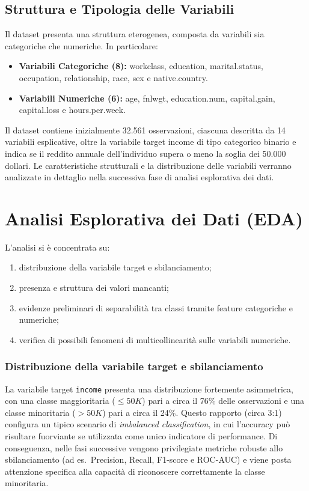 \documentclass[a4paper,11pt]{article}
\begin{document}
\subsection{Struttura e Tipologia delle Variabili}
Il dataset presenta una struttura eterogenea, composta da variabili sia categoriche che numeriche. In particolare:
\begin{itemize}
    \item \textbf{Variabili Categoriche (8):} {workclass}, {education}, {marital.status}, {occupation}, {relationship}, {race}, {sex} e {native.country}.
    \item \textbf{Variabili Numeriche (6):} {age}, {fnlwgt}, {education.num}, {capital.gain}, {capital.loss} e {hours.per.week}.
\end{itemize}

\noindent Il dataset contiene inizialmente 32.561 osservazioni, ciascuna descritta da 14 variabili esplicative, oltre la variabile target {income} di tipo categorico binario e indica se il reddito annuale dell’individuo supera o meno la soglia dei 50.000 dollari.
\noindent
Le caratteristiche strutturali e la distribuzione delle variabili verranno analizzate in dettaglio nella successiva fase di analisi esplorativa dei dati.


\newpage
\newpage
\section{Analisi Esplorativa dei Dati (EDA)}

L'analisi si è concentrata su:
\begin{enumerate}[label=(\roman*)]
    \item distribuzione della variabile target e sbilanciamento;
    \item presenza e struttura dei valori mancanti;
    \item evidenze preliminari di separabilità tra classi tramite feature categoriche e numeriche;
    \item verifica di possibili fenomeni di multicollinearità sulle variabili numeriche.
\end{enumerate}

\subsubsection{Distribuzione della variabile target e sbilanciamento}
La variabile target \texttt{income} presenta una distribuzione fortemente asimmetrica, con una classe maggioritaria (\(\leq 50K\)) pari a circa il 76\% delle osservazioni e una classe minoritaria (\(>50K\)) pari a circa il 24\%. 
Questo rapporto (circa 3:1) configura un tipico scenario di \textit{imbalanced classification}, in cui l’accuracy può risultare fuorviante se utilizzata come unico indicatore di performance. 
Di conseguenza, nelle fasi successive vengono privilegiate metriche robuste allo sbilanciamento (ad es.\ Precision, Recall, F1-score e ROC-AUC) e viene posta attenzione specifica alla capacità di riconoscere correttamente la classe minoritaria. 
\end{document}

